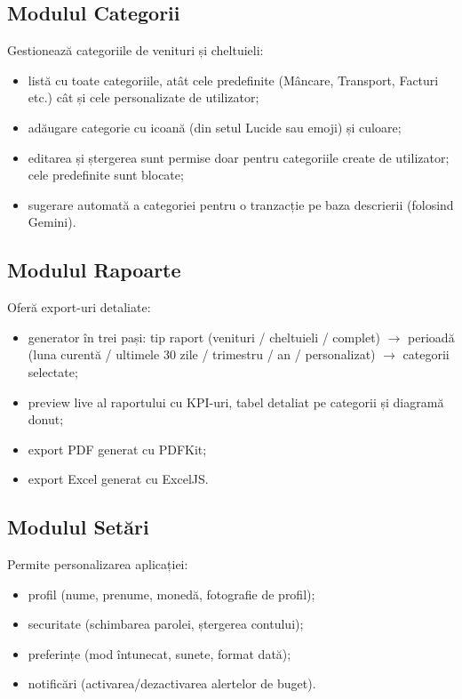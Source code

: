 \documentclass[12pt,a4paper,oneside]{report}
\begin{document}
\subsection*{Modulul Categorii}

Gestionează categoriile de venituri și cheltuieli:

\begin{itemize}[leftmargin=2cm,itemsep=2pt]
  \item listă cu toate categoriile, atât cele predefinite (Mâncare, Transport, Facturi etc.) cât și cele personalizate de utilizator;
  \item adăugare categorie cu icoană (din setul Lucide sau emoji) și culoare;
  \item editarea și ștergerea sunt permise doar pentru categoriile create de utilizator; cele predefinite sunt blocate;
  \item sugerare automată a categoriei pentru o tranzacție pe baza descrierii (folosind Gemini).
\end{itemize}

\subsection*{Modulul Rapoarte}

Oferă export-uri detaliate:

\begin{itemize}[leftmargin=2cm,itemsep=2pt]
  \item generator în trei pași: tip raport (venituri / cheltuieli / complet) $\rightarrow$ perioadă (luna curentă / ultimele 30 zile / trimestru / an / personalizat) $\rightarrow$ categorii selectate;
  \item preview live al raportului cu KPI-uri, tabel detaliat pe categorii și diagramă donut;
  \item export PDF generat cu PDFKit;
  \item export Excel generat cu ExcelJS.
\end{itemize}

\subsection*{Modulul Setări}

Permite personalizarea aplicației:

\begin{itemize}[leftmargin=2cm,itemsep=2pt]
  \item profil (nume, prenume, monedă, fotografie de profil);
  \item securitate (schimbarea parolei, ștergerea contului);
  \item preferințe (mod întunecat, sunete, format dată);
  \item notificări (activarea/dezactivarea alertelor de buget).
\end{itemize}
\end{document}
